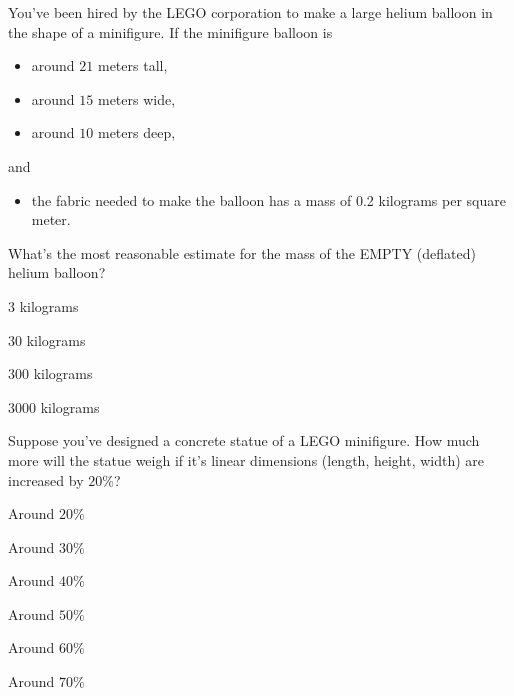 \documentclass{ximera}
\author{Bart Snapp}
\begin{document}
\maketitle


\begin{exercise}
  You've been hired by the LEGO corporation to make a large helium balloon in the shape of a minifigure. If the minifigure balloon is
\begin{itemize}
    \item around $21$ meters tall,
    \item around $15$ meters wide,
    \item around $10$ meters deep,
\end{itemize}
and
\begin{itemize}
    \item the fabric needed to make the balloon has a mass of 0.2 kilograms per square meter.
\end{itemize}
What's the most reasonable estimate for the mass of the EMPTY
(deflated) helium balloon?
  \begin{enumerate}\begin{multicols}{2}
    \item $3$ kilograms
    \item $30$ kilograms
    \item $300$ kilograms
    \item $3000$ kilograms
    \end{multicols}
  \end{enumerate}
\end{exercise}





\begin{exercise}
  Suppose you've designed a concrete statue of a LEGO minifigure.  How
  much more will the statue weigh if it's linear dimensions (length,
  height, width) are increased by $20\%$?
  \begin{enumerate}\begin{multicols}{2}
    \item Around $20\%$
    \item Around $30\%$
    \item Around $40\%$
    \item Around $50\%$
    \item Around $60\%$
    \item Around $70\%$
    \end{multicols}
  \end{enumerate}
\end{exercise}
\end{document}
